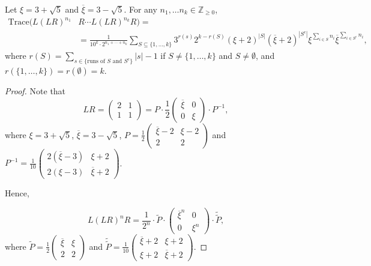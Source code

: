 \documentclass[10pt,a4paper]{amsart}
\begin{document}
\begin{proposition} Let $\xi=3+\sqrt{5}$ and $\overline\xi=3-\sqrt{5}$. For any $n_1,\dots n_k\in \mathbb{Z}_{\geq0}$, 
\begin{align*}
\mathrm{Trace}(L(LR)^{n_1}&R \cdots L(LR)^{n_k}R)=\\&=\frac{1}{10^k\cdot 2^{n_1+\cdots +n_k}}\sum_{S\subseteq\{1,\hdots,k\}}3^{r(s)}2^{k-r(S)}(\xi+2)^{|S|}(\overline\xi+2)^{|S^c|}\xi^{\sum_{i\in S}n_i}\overline\xi^{\sum_{i\in S^c}n_i},
\end{align*}
where $r(S)=\sum_{s\in\{\text{runs of }S\text{ and }S^c\}}|s|-1$ if $S\neq \{1,\hdots, k\}$ and $S\neq\emptyset$, and $r(\{1,\hdots, k\})=r(\emptyset)=k$.
    
\end{proposition}

\begin{proof}
Note that
\[
LR=\begin{pmatrix}
2 & 1 \\
1 & 1 
\end{pmatrix}=P\cdot \frac{1}{2}\begin{pmatrix}
\overline{\xi} & 0 \\
0 & \xi 
\end{pmatrix}\cdot P^{-1},
\]
where $\xi=3+\sqrt{5}$, $\overline{\xi}=3-\sqrt{5}$, $P=\frac{1}{2}\begin{pmatrix}
    \overline{\xi}-2 & \xi -2 \\ 2 & 2
\end{pmatrix}$ and $P^{-1}=\frac{1}{10}\begin{pmatrix}
    2(\overline{\xi}-3) & \xi+2 \\ 2(\xi-3) & \overline{\xi}+2
\end{pmatrix}$.

Hence, 

\[
L(LR)^nR=\frac{1}{2^n}\cdot \tilde{P}\cdot  \begin{pmatrix}
\overline{\xi}^n & 0 \\
0 & \xi^n 
\end{pmatrix} \cdot \tilde{\tilde{P}},
\]
where $\tilde{P}=\frac{1}{2}\begin{pmatrix}
    \overline{\xi} & \xi \\ 2 & 2
\end{pmatrix}$ and $\tilde{\tilde{P}}=\frac{1}{10}\begin{pmatrix}
    \overline{\xi}+2 & \xi+2 \\ \xi+2 & \overline{\xi}+2
\end{pmatrix}$.


\end{proof}
\end{document}
